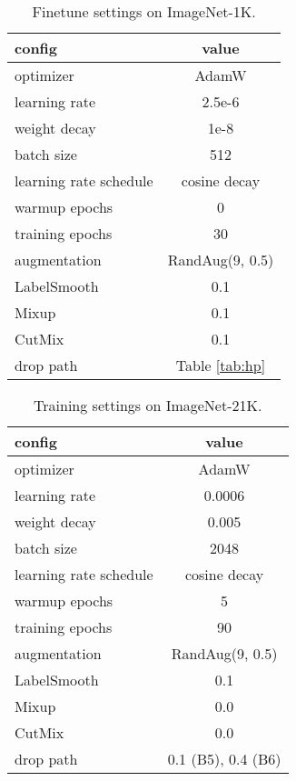 \documentclass[runningheads]{llncs}
\begin{document}
\begin{table}[t]
    \centering
    \caption{Finetune settings on ImageNet-1K.}
    \begin{tabular}{l|c}
    \toprule
    config & value \\
    \midrule
    optimizer & AdamW \cite{adam} \\
    learning rate & 2.5e-6 \\
    weight decay & 1e-8 \\
    batch size & 512 \\
    learning rate schedule & cosine decay \\
    warmup epochs & 0 \\
    training epochs & 30 \\
    augmentation & RandAug(9, 0.5) \cite{randaug} \\
    LabelSmooth \cite{inception} & 0.1 \\
    Mixup \cite{mixup} & 0.1 \\
    CutMix \cite{cutmix} & 0.1 \\
    drop path \cite{droppath} & Table \ref{tab:hp} \\
    \bottomrule
    \end{tabular}
\label{tab:finetune}
\end{table}


\begin{table}[t]
    \centering
    \caption{Training settings on ImageNet-21K.}
    \begin{tabular}{l|c}
    \toprule
    config & value \\
    \midrule
    optimizer & AdamW \cite{adam} \\
    learning rate & 0.0006 \\
    weight decay & 0.005 \\
    batch size & 2048 \\
    learning rate schedule & cosine decay \\
    warmup epochs & 5 \\
    training epochs & 90 \\
    augmentation & RandAug(9, 0.5) \cite{randaug} \\
    LabelSmooth \cite{inception} & 0.1 \\
    Mixup \cite{mixup} & 0.0 \\
    CutMix \cite{cutmix} & 0.0 \\
    drop path \cite{droppath} & 0.1 (B5), 0.4 (B6) \\
    \bottomrule
    \end{tabular}
\label{tab:training_21k}
\end{table}
\end{document}

